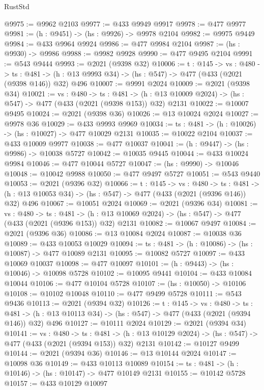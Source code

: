\begin{lexlean}{RustStd}
\begin{coremodule}
{\begin{coremodule}
{{{{{{{{{{{{{{{{@9975 := @9962 @2103
@9977 := @433 @9949 @9917
@9978 := @477 @9977
@9981 := (h : @9451) -> (hs : @9926) -> @9978 @2104
@9982 := @9975 @9449
@9984 := @433 @9964 @9924
@9986 := @477 @9984 @2104
@9987 := (hs : @9930) -> @9986
@9988 := @9982 @9928
@9990 := @477 @9495 @2104
@9991 := @543 @9444
@9993 := @2021 (@9398 @32)
@10006 := {t : @145} ->
  {vs : @480} ->
  {ts : @481} -> (h : @13 @9993 @34) -> (hs : @547) -> @477 (@433 (@2021 (@9398 @146)) @32) @496
@10007 := @9991 @2024
@10009 := @2021 (@9398 @34)
@10021 := {vs : @480} ->
  {ts : @481} -> (h : @13 @10009 @2024) -> (hs : @547) -> @477 (@433 (@2021 (@9398 @153)) @32) @2131
@10022 := @10007 @9495
@10024 := @2021 (@9398 @36)
@10026 := @13 @10024 @2024
@10027 := @9978 @36
@10029 := @433 @9993 @9969
@10034 := {ts : @481} -> (h : @10026) -> (hs : @10027) -> @477 @10029 @2131
@10035 := @10022 @2104
@10037 := @433 @10009 @9977
@10038 := @477 @10037
@10041 := (h : @9447) -> (hs : @9986) -> @10038 @5727
@10042 := @10035 @9445
@10044 := @433 @10024 @9984
@10046 := @477 @10044 @5727
@10047 := (hs : @9990) -> @10046
@10048 := @10042 @9988
@10050 := @477 @9497 @5727
@10051 := @543 @9440
@10053 := @2021 (@9396 @32)
@10066 := {t : @145} ->
  {vs : @480} ->
  {ts : @481} -> (h : @13 @10053 @34) -> (hs : @547) -> @477 (@433 (@2021 (@9396 @146)) @32) @496
@10067 := @10051 @2024
@10069 := @2021 (@9396 @34)
@10081 := {vs : @480} ->
  {ts : @481} -> (h : @13 @10069 @2024) -> (hs : @547) -> @477 (@433 (@2021 (@9396 @153)) @32) @2131
@10082 := @10067 @9497
@10084 := @2021 (@9396 @36)
@10086 := @13 @10084 @2024
@10087 := @10038 @36
@10089 := @433 @10053 @10029
@10094 := {ts : @481} -> (h : @10086) -> (hs : @10087) -> @477 @10089 @2131
@10095 := @10082 @5727
@10097 := @433 @10069 @10037
@10098 := @477 @10097
@10101 := (h : @9443) -> (hs : @10046) -> @10098 @5728
@10102 := @10095 @9441
@10104 := @433 @10084 @10044
@10106 := @477 @10104 @5728
@10107 := (hs : @10050) -> @10106
@10108 := @10102 @10048
@10110 := @477 @9499 @5728
@10111 := @543 @9436
@10113 := @2021 (@9394 @32)
@10126 := {t : @145} ->
  {vs : @480} ->
  {ts : @481} -> (h : @13 @10113 @34) -> (hs : @547) -> @477 (@433 (@2021 (@9394 @146)) @32) @496
@10127 := @10111 @2024
@10129 := @2021 (@9394 @34)
@10141 := {vs : @480} ->
  {ts : @481} -> (h : @13 @10129 @2024) -> (hs : @547) -> @477 (@433 (@2021 (@9394 @153)) @32) @2131
@10142 := @10127 @9499
@10144 := @2021 (@9394 @36)
@10146 := @13 @10144 @2024
@10147 := @10098 @36
@10149 := @433 @10113 @10089
@10154 := {ts : @481} -> (h : @10146) -> (hs : @10147) -> @477 @10149 @2131
@10155 := @10142 @5728
@10157 := @433 @10129 @10097
}}}}}}}}}}}}}}}}
\end{coremodule}}
\end{coremodule}
\end{lexlean}

